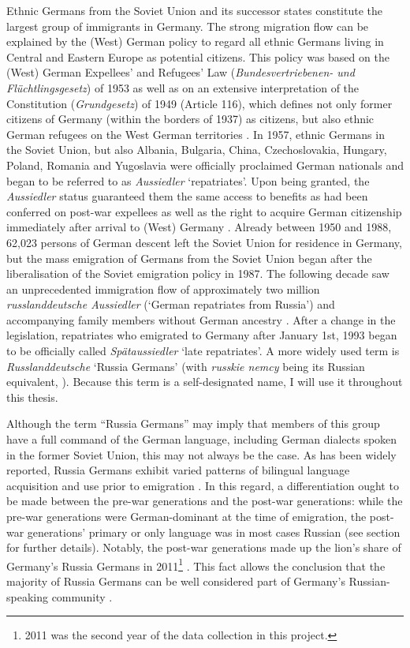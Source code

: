Ethnic Germans from the Soviet Union and its successor states constitute the largest group of immigrants in Germany. The strong migration flow can be explained by the (West) German policy to regard all ethnic Germans living in Central and Eastern Europe as potential citizens. This policy was based on the (West) German Expellees' and Refugees' Law (\textit{Bundesvertriebenen- und Flüchtlingsgesetz}) of 1953 as well as on an extensive interpretation of the Constitution (\textit{Grundgesetz}) of 1949 (Article 116), which defines  not only former citizens of Germany (within the borders of 1937) as citizens, but also ethnic German refugees on the West German territories \citep{muenz03}. In 1957, ethnic Germans in the Soviet Union, but also Albania, Bulgaria, China, Czechoslovakia, Hungary, Poland, Romania and Yugoslavia were officially proclaimed German nationals and began to be referred to as \textit{Aussiedler} `repatriates'. Upon being granted, the \textit{Aussiedler} status guaranteed them the same access to benefits as had been conferred on post-war expellees as well as the right to acquire German citizenship immediately after arrival to (West) Germany \citep{muenz03}. Already between 1950 and 1988, 62,023 persons of German descent left the Soviet Union for residence in Germany, but the mass emigration of Germans from the Soviet Union began after the liberalisation of the Soviet emigration policy in 1987. The following decade saw an unprecedented immigration flow of approximately two million \textit{russlanddeutsche Aussiedler} (`German repatriates from Russia') and accompanying family members without German ancestry \citep{lederer97}. After a change in the legislation, repatriates who emigrated to Germany after January 1st, 1993 began to be officially called \textit{Spätaussiedler} `late repatriates'. A more widely used term is \textit{Russlanddeutsche} `Russia Germans' (with \textit{russkie nemcy} being its Russian equivalent, \citealt[cf.][]{meng-protas}). Because this term is a self-designated name, I will use it throughout this thesis.

Although the term “Russia Germans” may imply that members of this group have a full command of the German language, including German dialects spoken in the former Soviet Union, this may not always be the case. As has been widely reported, Russia Germans exhibit varied patterns of bilingual language acquisition and use prior to emigration \citep{berend98,meng01,riehlTA,worbs-etal-13}. In this regard, a differentiation ought to be made between the pre-war generations and the post-war generations: while the pre-war generations were German-dominant at the time of emigration, the post-war generations' primary or only language was in most cases Russian (see section  for further details). Notably, the post-war generations made up the lion's share of Germany's Russia Germans in 2011\footnote{2011 was the second year of the data collection in this project.} \citep[41]{worbs-etal-13}. This fact allows the conclusion that the majority of Russia Germans can be well considered part of Germany's Russian-speaking community \citep[cf.][]{meng01,roll03,brehmer07}.


